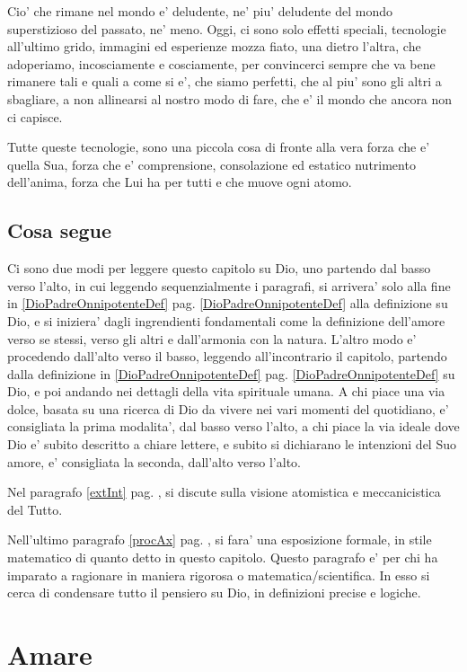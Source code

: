 Cio' che rimane nel mondo e' deludente, ne' piu' deludente del mondo superstizioso del passato, ne' meno. Oggi, ci sono solo effetti speciali, tecnologie all'ultimo grido, immagini ed esperienze mozza fiato, una dietro l'altra, che adoperiamo, incosciamente e cosciamente, per convincerci sempre che va bene rimanere tali e quali a come si e', che siamo perfetti, che al piu' sono gli altri a sbagliare, a non allinearsi al nostro modo di fare, che e' il mondo che ancora non ci capisce.

Tutte queste tecnologie, sono una piccola cosa di fronte alla vera forza che e' quella Sua, forza che e' comprensione, consolazione ed estatico nutrimento dell'anima, forza che Lui ha per tutti e che muove ogni atomo.

\subsection{Cosa segue}

Ci sono due modi per leggere questo capitolo su Dio, uno partendo dal basso verso l'alto, in cui leggendo sequenzialmente i paragrafi, si arrivera' solo alla fine in \ref{DioPadreOnnipotenteDef} pag. \ref{DioPadreOnnipotenteDef} alla definizione su Dio, e si iniziera' dagli ingrendienti fondamentali come la definizione dell'amore verso se stessi, verso gli altri e dall'armonia con la natura. L'altro modo e' procedendo dall'alto verso il basso, leggendo all'incontrario il capitolo, partendo dalla definizione in \ref{DioPadreOnnipotenteDef} pag. \ref{DioPadreOnnipotenteDef} su Dio, e poi andando nei dettagli della vita spirituale umana. A chi piace una via dolce, basata su una ricerca di Dio da vivere nei vari momenti del quotidiano, e' consigliata la prima modalita', dal basso verso l'alto, a chi piace la via ideale dove Dio e' subito descritto a chiare lettere, e subito si dichiarano le intenzioni del Suo amore, e' consigliata la seconda, dall'alto verso l'alto.

Nel paragrafo \ref{extInt} pag. \pageref{extInt}, si discute sulla visione atomistica e meccanicistica del Tutto.

Nell'ultimo paragrafo \ref{procAx} pag. \pageref{procAx}, si fara' una esposizione formale, in stile matematico di quanto detto in questo capitolo. Questo paragrafo e' per chi ha imparato a ragionare in maniera rigorosa o matematica/scientifica. In esso si cerca di condensare tutto il pensiero su Dio, in definizioni precise e logiche.

\section{Amare}
\label{amareSe}


